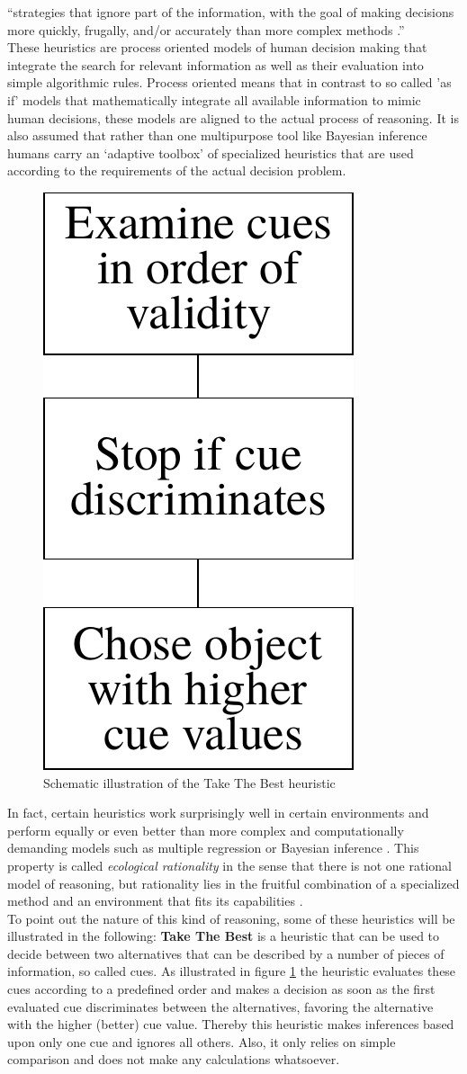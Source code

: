``strategies that ignore part of the information, with the goal of making decisions more quickly, frugally, and/or accurately than more complex methods \cite{Gigerenzer2011}.'' \\

These heuristics are process oriented models of human decision making that integrate the search for relevant information as well as their evaluation into simple algorithmic rules. Process oriented means that in contrast to so called 'as if' models that mathematically integrate all available information to mimic human decisions, these models are aligned to the actual process of reasoning. It is also assumed that rather than one multipurpose tool like Bayesian inference humans carry an `adaptive toolbox' of specialized heuristics \citep{gigerenzer2002bounded} that are used according to the requirements of the actual decision problem.
\begin{figure}
  \centering
  \includegraphics[width = .2 \textwidth]{figures/TTB.pdf}
  \caption{Schematic illustration of the Take The Best heuristic}
  \label{TTB}
\end{figure}
In fact, certain heuristics work surprisingly well in certain environments and perform equally or even better than more complex and computationally demanding models such as multiple regression or Bayesian inference \citep{Gigerenzer2009}. This property is called \emph{ecological rationality} in the sense that there is not one rational model of reasoning, but rationality lies in the fruitful combination of a specialized method and an environment that fits its capabilities \citep{todd2007environments}.\\
To point out the nature of this kind of reasoning, some of these heuristics will be illustrated in the following: \textbf{Take The Best} \citep{Gigerenzer1996} is a heuristic that can be used to decide between two alternatives that can be described by a number of pieces of information, so called cues. As illustrated in figure \ref{TTB} the heuristic evaluates these cues according to a predefined order and makes a decision as soon as the first evaluated cue discriminates between the alternatives, favoring the alternative with the higher (better) cue value. Thereby this heuristic makes inferences based upon only one cue and ignores all others. Also, it only relies on simple comparison and does not make any calculations whatsoever.\\
